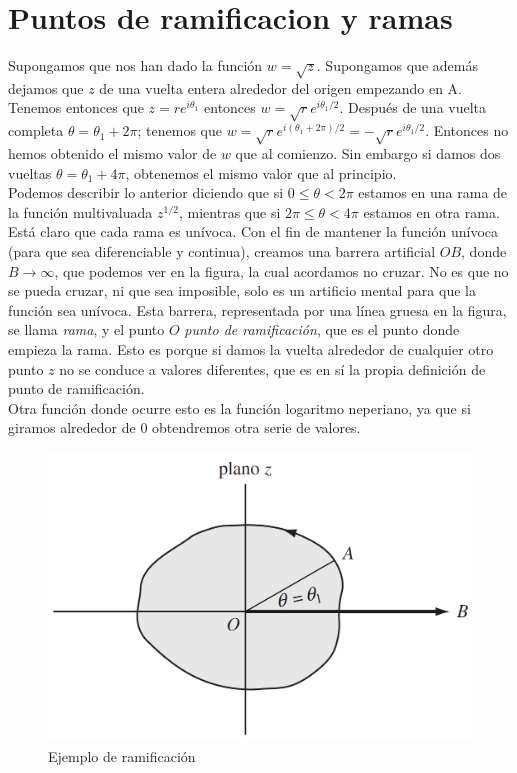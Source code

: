 \documentclass[12pt]{book}
\begin{document}
\section{Puntos de ramificacion y ramas}

Supongamos que nos han dado la función  $w = \sqrt{z}$. Supongamos que además dejamos que $z$ de una vuelta entera alrededor del origen empezando en A. Tenemos entonces que $z=re^{i\theta_1}$ entonces $w = \sqrt{r} e^{i \theta_1 /2}$. Después de una vuelta completa $\theta = \theta_1 + 2\pi$; tenemos que $w = \sqrt{r} e^{i (\theta_1 +2 \pi)/2} = - \sqrt{r} e^{i \theta_1 /2}$. Entonces no hemos obtenido el mismo valor de $w$ que al comienzo. Sin embargo si damos dos vueltas $\theta = \theta_1 + 4 \pi$, obtenemos el mismo valor que al principio.  \\

Podemos describir lo anterior diciendo que si $0 \leq \theta < 2 \pi$ estamos en una rama de la función multivaluada $z^{1/2}$, mientras que si $ 2 \pi \leq \theta < 4 \pi $ estamos en otra rama. \\

Está claro que cada rama es unívoca. Con el fin de mantener la función unívoca (para que sea diferenciable y continua), creamos una barrera artificial $OB$, donde $B \rightarrow \infty$, que podemos ver en la figura, la cual acordamos no cruzar. No es que no se pueda cruzar, ni que sea imposible, solo es un artificio mental para que la función sea unívoca. Esta barrera, representada por una línea gruesa en la figura, se llama \textit{rama}, y el punto $O$ \textit{punto de ramificación}, que es el punto donde empieza la rama. Esto es porque si damos la vuelta alrededor de cualquier otro punto $z$ no se conduce a valores diferentes, que es en sí la propia definición de punto de ramificación. \\

Otra función donde ocurre esto es la función logaritmo neperiano, ya que si giramos alrededor de $0$ obtendremos otra serie de valores.

\begin{figure}[h!] \centering
\includegraphics[scale=0.3]{ramificaciones.png}
\caption{Ejemplo de ramificación}
\end{figure}
\end{document}
